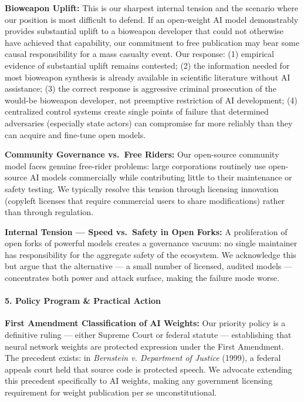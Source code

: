 \textbf{Bioweapon Uplift:} This is our sharpest internal tension and the
scenario where our position is most difficult to defend. If an
open-weight AI model demonstrably provides substantial uplift to a
bioweapon developer that could not otherwise have achieved that
capability, our commitment to free publication may bear some causal
responsibility for a mass casualty event. Our response: (1) empirical
evidence of substantial uplift remains contested; (2) the information
needed for most bioweapon synthesis is already available in scientific
literature without AI assistance; (3) the correct response is aggressive
criminal prosecution of the would-be bioweapon developer, not preemptive
restriction of AI development; (4) centralized control systems create
single points of failure that determined adversaries (especially state
actors) can compromise far more reliably than they can acquire and
fine-tune open models.

\textbf{Community Governance vs.~Free Riders:} Our open-source community
model faces genuine free-rider problems: large corporations routinely
use open-source AI models commercially while contributing little to
their maintenance or safety testing. We typically resolve this tension
through licensing innovation (copyleft licenses that require commercial
users to share modifications) rather than through regulation.

\textbf{Internal Tension --- Speed vs.~Safety in Open Forks:} A
proliferation of open forks of powerful models creates a governance
vacuum: no single maintainer has responsibility for the aggregate safety
of the ecosystem. We acknowledge this but argue that the alternative ---
a small number of licensed, audited models --- concentrates both power
and attack surface, making the failure mode worse.

\paragraph{5. Policy Program \& Practical
Action}\label{policy-program-practical-action-12}

\textbf{First Amendment Classification of AI Weights:} Our priority
policy is a definitive ruling --- either Supreme Court or federal
statute --- establishing that neural network weights are protected
expression under the First Amendment. The precedent exists: in
\emph{Bernstein v. Department of Justice} (1999), a federal appeals
court held that source code is protected speech. We advocate extending
this precedent specifically to AI weights, making any government
licensing requirement for weight publication per se unconstitutional.

